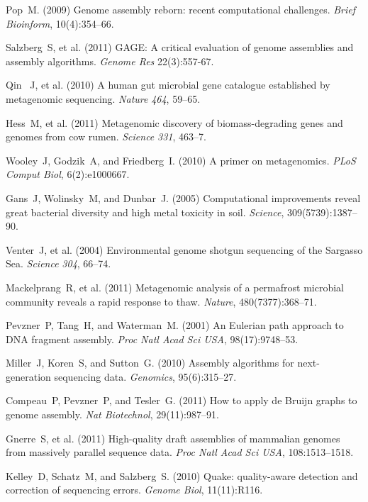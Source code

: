 \documentclass{pnastwo}
\begin{document}
\begin{article}
\begin{thebibliography}{10}
 Pop~M. (2009) Genome assembly reborn: recent 
computational challenges. {\it Brief Bioinform}, 10(4):354--66.

 Salzberg~S, et al. (2011) GAGE: A critical 
evaluation of genome assemblies and assembly algorithms. {\it Genome Res} 
22(3):557-67.

 Qin ~J, et al. (2010) A human gut microbial gene catalogue 
established by metagenomic sequencing. {\it Nature} \emph{464}, 59--65.

 Hess~M, et al. (2011) Metagenomic discovery of 
biomass-degrading genes and genomes from cow rumen. {\it Science} 
\emph{331}, 463--7.

 Wooley~J, Godzik~A, and Friedberg~I. (2010) A primer 
on metagenomics. {\it PLoS Comput Biol}, 6(2):e1000667.

 Gans~J, Wolinsky~M, and Dunbar~J. (2005) 
Computational improvements reveal great bacterial diversity and high metal 
toxicity in soil. {\it Science}, 309(5739):1387--90.

 Venter~J, et al. (2004) Environmental genome shotgun 
sequencing of the Sargasso Sea. {\it Science} \emph{304}, 66--74.

 Mackelprang~R, et al. (2011) Metagenomic analysis of a 
permafrost microbial community reveals a rapid response to thaw. {\it Nature}, 
480(7377):368--71.

 Pevzner~P, Tang~H, and Waterman~M. (2001) An 
Eulerian path approach to DNA fragment assembly. {\it Proc Natl Acad Sci USA},
 98(17):9748--53.

 Miller~J, Koren~S, and Sutton~G. (2010) Assembly 
algorithms for next-generation sequencing data. {\it Genomics}, 95(6):315--27.

 Compeau~P, Pevzner~P, and Tesler~G. (2011) How to 
apply de {B}ruijn graphs to genome assembly. {\it Nat Biotechnol}, 
29(11):987--91.

 Gnerre~S, et al. (2011) High-quality draft assemblies 
of mammalian genomes from massively parallel sequence data. {\it Proc Natl 
Acad Sci USA}, 108:1513--1518.

 Kelley~D, Schatz~M, and Salzberg~S. (2010) Quake: 
quality-aware detection and correction of sequencing errors. {\it Genome 
Biol}, 11(11):R116.


\end{thebibliography}
\end{article}
\end{document}
